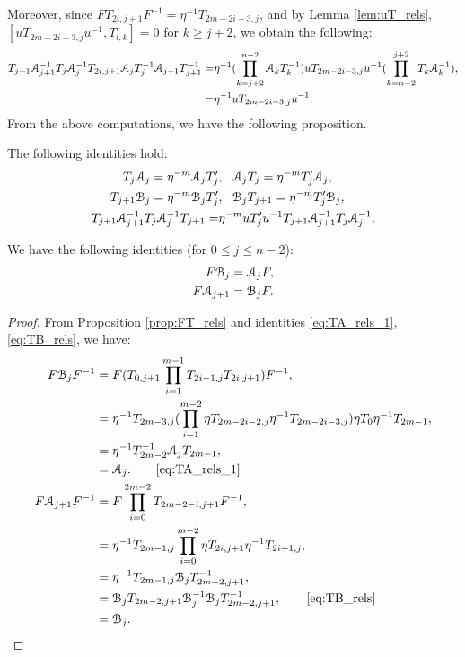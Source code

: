 \documentclass{amsart}
\begin{document}
Moreover, since $FT_{2i,j+1}F^{-1}=\eta^{-1}T_{2m-2i-3,j}$, and by Lemma \ref{lem:uT_rels}, $[uT_{2m-2i-3,j}u^{-1},T_{l,k}]=0$ for $k\geq j+2$, we obtain the following: 
\[
\begin{aligned}
T_{j+1}\AA^{-1}_{j+1}T_{j}\AA^{-1}_{j}T_{2i,j+1}\AA_{j}T_{j}^{-1}\AA_{j+1}T_{j+1}^{-1}=&\eta^{-1}(\prod ^{n-2}_{k=j+2}\AA_kT_k^{-1}) uT_{2m-2i-3,j}u^{-1}(\prod ^{j+2}_{k=n-2}T_k\AA^{-1}_k),\\
=&\eta^{-1} uT_{2m-2i-3,j}u^{-1}.    
\end{aligned}
\]
From the above computations, we have the following proposition.
\begin{prop}\label{prop:TAB_rels}
The following identities hold:
\[
\begin{aligned}
T_j\AA_j=\eta^{-m}\AA_jT'_j&,\ \  \AA_jT_j=\eta^{-m}T'_j\AA_j,
\\
T_{j+1}\BB_j=\eta^{-m}\BB_jT'_j&,\ \  \BB_jT_{j+1}=\eta^{-m}T'_j\BB_j,
\\
T_{j+1}\AA^{-1}_{j+1}T_{j}\AA^{-1}_{j}T_{j+1}=
&\eta^{-m} uT'_{j}u^{-1}T_{j+1}\AA^{-1}_{j+1}T_{j}\AA^{-1}_{j}.      
\end{aligned}
\]
\end{prop}
\begin{prop}   
\label{prop:FAB_rels}
We have the following identities (for $0\leq j\leq n-2$):
\begin{align}
 F\BB_j&=\AA_j F, \\
 F\AA_{j+1}&=\BB_jF.
\end{align}
\end{prop}
\begin{proof}
From Proposition \ref{prop:FT_rels} and identities \eqref{eq:TA_rels_1}, \eqref{eq:TB_rels}, we have:
 \[
 \begin{aligned}
  F\BB_{j}F^{-1}&=F(T_{0,j+1}\prod^{m-1}_{i=1}T_{2i-1,j}T_{2i,j+1})F^{-1},\\
  &=\eta^{-1}T_{2m-3,j}(\prod^{m-2}_{i=1}\eta T_{2m-2i-2,j}\eta^{-1}T_{2m-2i-3,j})\eta T_0\eta^{-1} T_{2m-1},\\
  &=\eta^{-1}T^{-1}_{2m-2}\AA_jT_{2m-1},\\
  &=\AA_j.\qquad \eqref{eq:TA_rels_1}\\
 F\AA_{j+1}F^{-1}&=F\prod_{i=0}^{2m-2}T_{2m-2-i,j+1}  F^{-1},\\
  &=\eta^{-1}T_{2m-1,j}\prod^{m-2}_{i=0}\eta T_{2i,j+1}\eta^{-1}T_{2i+1,j},\\
  &=\eta^{-1}T_{2m-1,j}\BB_jT^{-1}_{2m-2,j+1},\\
  &=\BB_jT_{2m-2,j+1}\BB^{-1}_j\BB_jT^{-1}_{2m-2,j+1},\qquad\eqref{eq:TB_rels}\\
  &=\BB_j.
 \end{aligned}
 \]
\end{proof}
\end{document}
